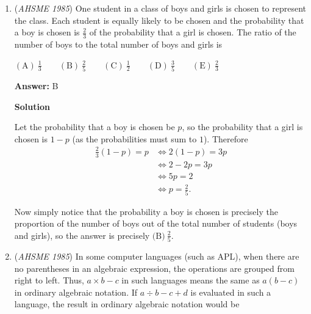 \begin{enumerate}
 Since $9$ and $40$ are coprime, we deduce that $xy$ is a multiple of $40$, so $x$ or $y$ must be a multiple of $5$. It follows that one of them must be $10$, and we obtain 
 \begin{align*}\frac{9}{40}-\frac{1}{10} &= \frac{9-4}{40} \\ &= \frac{5}{40} \\ &= \frac{1}{8},\end{align*}
 so the two terms we must remove are $\boxed{\text{(E)} \ \frac{1}{8}\text{ and }\frac{1}{10}}$.

 


	\item (\textit{AHSME 1985}) One student in a class of boys and girls is chosen to represent the class. Each student is equally likely to be chosen and the probability that a boy is chosen is $\frac{2}{3}$ of the probability that a girl is chosen. The ratio of the number of boys to the total number of boys and girls is


 $\mathrm{(A)\ } \frac{1}{3} \qquad \mathrm{(B) \ }\frac{2}{5} \qquad \mathrm{(C) \  } \frac{1}{2} \qquad \mathrm{(D) \  } \frac{3}{5} \qquad \mathrm{(E) \  }\frac{2}{3}$

 \textbf{Answer: }B



\textbf{Solution}

Let the probability that a boy is chosen be $p$, so the probability that a girl is chosen is $1-p$ (as the probabilities must sum to $1$). Therefore 
 \begin{align*}\frac{2}{3}(1-p) = p &\iff 2(1-p) = 3p \\ &\iff 2-2p = 3p \\&\iff 5p = 2 \\&\iff p = \frac{2}{5}.\end{align*}


 Now simply notice that the probability a boy is chosen is precisely the proportion of the number of boys out of the total number of students (boys and girls), so the answer is precisely $\boxed{\text{(B)} \ \frac{2}{5}}$.

 


	\item (\textit{AHSME 1985}) In some computer languages (such as APL), when there are no parentheses in an algebraic expression, the operations are grouped from right to left. Thus, $a \times b - c$ in such languages means the same as $a(b-c)$ in ordinary algebraic notation. If $a\div b-c+d$ is evaluated in such a language, the result in ordinary algebraic notation would be



\end{enumerate}

